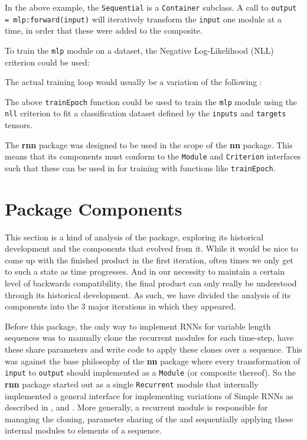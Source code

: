 \documentclass{article} %
\providecommand{\inlinecode}[1]{\texttt{#1}}
\begin{document}


In the above example, the \inlinecode{Sequential} is a \inlinecode{Container} subclass.
A call to \inlinecode{output = mlp:forward(input)} will iteratively transform the \inlinecode{input}
one module at a time, in order that these were added to the composite.

To train the \inlinecode{mlp} module on a dataset, 
the Negative Log-Likelihood (NLL) criterion could be used:



The actual training loop would usually be a variation of the following :



The above \inlinecode{trainEpoch} function could be used to train the
\inlinecode{mlp} module using the \inlinecode{nll} criterion
to fit a classification dataset defined by the \inlinecode{inputs} and 
\inlinecode{targets} tensors. 

The \textbf{rnn} package was designed to be used in the scope of the \textbf{nn} package.
This means that its components must conform to the \inlinecode{Module} and 
\inlinecode{Criterion} interfaces such that these can be used in 
for training with functions like \inlinecode{trainEpoch}.

\section{Package Components}

This section is a kind of analysis of the package, exploring 
its historical development and the components that evolved from it. 
While it would be nice to come up 
with the finished product in the first iteration, often times we only get to such a state 
as time progresses. And in our necessity to maintain a certain level of backwards compatibility,
the final product can only really be understood through its historical development.
As such, we have divided the analysis of its components into the 3 major iterations in 
which they appeared.
 
Before this package, the only way to implement RNNs for variable length sequences was to manually 
clone the recurrent modules for each time-step, have these share parameters and
write code to apply these clones over a sequence. This was against the base
philosophy of the \textbf{nn} package where every transformation of \inlinecode{input} to \inlinecode{output} should 
implemented as a \inlinecode{Module} (or composite thereof). 
So the \textbf{rnn} package started out as a single \inlinecode{Recurrent} module that 
internally implemented a general interface for implementing variations of Simple RNNs
as described in \cite[section 2.5-2.8]{sutskever2013training}, 
\cite[section~3.2-3.3]{mikolov2012statistical} and \cite{boden2001guide}. 
More generally, a recurrent module is responsible for managing the cloning, 
parameter sharing of the and sequentially applying these internal modules
to elements of a sequence. 
\end{document}
